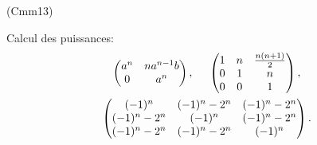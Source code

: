 \begin{tiny}(Cmm13)\end{tiny} Calcul des puissances:
\begin{multline*}
  \begin{pmatrix}
  a^n & na^{n-1}b \\ 0 & a^n
 \end{pmatrix},\hspace{0.5cm}
 \begin{pmatrix}
   1 & n & \frac{n(n+1)}{2}\\ 0 & 1 & n \\ 0 & 0 & 1
  \end{pmatrix},\\
  \begin{pmatrix}
   (-1)^n & (-1)^n-2^{n} & (-1)^n-2^{n}\\
   (-1)^n-2^{n} & (-1)^n & (-1)^n-2^{n}\\
   (-1)^n-2^{n} & (-1)^n-2^{n} & (-1)^n
  \end{pmatrix}.
\end{multline*}
 
